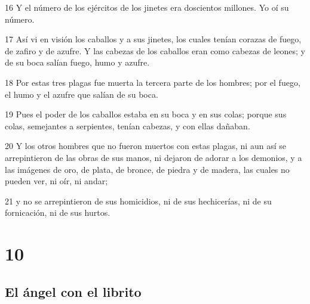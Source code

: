 \par 16 Y el número de los ejércitos de los jinetes era doscientos millones. Yo oí su número.
\par 17 Así vi en visión los caballos y a sus jinetes, los cuales tenían corazas de fuego, de zafiro y de azufre. Y las cabezas de los caballos eran como cabezas de leones; y de su boca salían fuego, humo y azufre.
\par 18 Por estas tres plagas fue muerta la tercera parte de los hombres; por el fuego, el humo y el azufre que salían de su boca.
\par 19 Pues el poder de los caballos estaba en su boca y en sus colas; porque sus colas, semejantes a serpientes, tenían cabezas, y con ellas dañaban.
\par 20 Y los otros hombres que no fueron muertos con estas plagas, ni aun así se arrepintieron de las obras de sus manos, ni dejaron de adorar a los demonios, y a las imágenes de oro, de plata, de bronce, de piedra y de madera, las cuales no pueden ver, ni oír, ni andar;
\par 21 y no se arrepintieron de sus homicidios, ni de sus hechicerías, ni de su fornicación, ni de sus hurtos.

\chapter{10}

\section*{El ángel con el librito}

